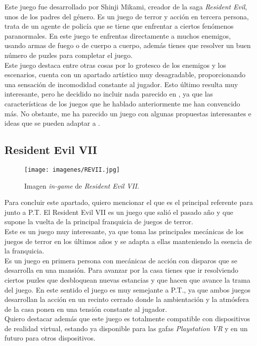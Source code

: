 Este juego fue desarrollado por Shinji Mikami, creador de la saga \textit{Resident Evil}, unos de los padres del género. Es un juego de terror y acción en tercera persona, trata de un agente de policía que se tiene que enfrentar a ciertos fenómenos paranormales. En este juego te enfrentas directamente a muchos enemigos, usando armas de fuego o de cuerpo a cuerpo, además tienes que resolver un buen número de puzles para completar el juego.
\\

Este juego destaca entre otras cosas por lo grotesco de los enemigos y los escenarios, cuenta con un apartado artístico muy desagradable, proporcionando una sensación de incomodidad constante al jugador. Esto último resulta muy interesante, pero he decidido no incluir nada parecido en \nombreJuego, ya que las características de los juegos que he hablado anteriormente me han convencido más. No obstante, me ha parecido un juego con algunas propuestas interesantes e ideas que se pueden adaptar a \textbf{\nombreJuego}.

\subsection{Resident Evil VII}

\begin{figure}
	\begin{center}
		\texttt{[image: imagenes/REVII.jpg]}
		\caption{Imagen \textit{in-game} de \textit{Resident Evil VII}.}
		\label{ResidentEvil}
	\end{center}
\end{figure}

Para concluir este apartado, quiero mencionar el que es el principal referente para \textbf{\nombreJuego} junto a P.T. El Resident Evil VII es un juego que salió el pasado año y que supone la vuelta de la principal franquicia de juegos de terror.
\\

Este es un juego muy interesante, ya que toma las principales mecánicas de los juegos de terror en los últimos años y se adapta a ellas manteniendo la esencia de la franquicia.
\\

Es un juego en primera persona con mecánicas de acción con disparos que se desarrolla en una mansión. Para avanzar por la casa tienes que ir resolviendo ciertos puzles que desbloquean nuevas estancias y que hacen que avance la trama del juego. En este sentido el juego es muy semejante a P.T., ya que ambos juegos desarrollan la acción en un recinto cerrado donde la ambientación y la atmósfera de la casa ponen en una tensión constante al jugador.
\\
Quiero destacar además que este juego es totalmente compatible con dispositivos de realidad virtual, estando ya disponible para las gafas \textit{Playstation VR} y en un futuro para otros dispositivos.
\\








